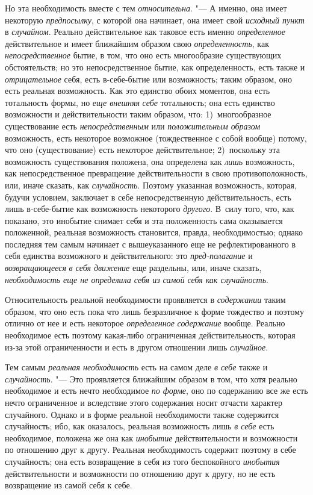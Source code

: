 Но эта необходимость вместе с тем {\em относительна}. "---
А именно, она имеет некоторую {\em предпосылку}, с
которой она начинает, она имеет свой {\em исходный
пункт} в {\em случайном}. Реально действительное как
таковое есть именно {\em определенное} действительное и
имеет ближайшим образом свою {\em определенность}, как
{\em непосредственное} бытие, в том, что оно есть
многообразие существующих обстоятельств; но это непосредственное бытие, как
определенность, есть также и {\em отрицательное} себя,
есть в-себе-бытие или возможность; таким образом, оно есть реальная
возможность. Как это единство обоих моментов, она есть тотальность формы,
но {\em еще внешняя} {\em себе}
тотальность; она есть единство возможности и действительности таким
образом, что: 1)~многообразное существование есть
{\em непосредственным} или
{\em положительным образом} возможность, есть некоторое
возможное (тождественное с собой вообще) потому, что оно (существование)
есть некоторое действительное; 2)~поскольку эта возможность существования
положена, она определена как {\em лишь} возможность,
как непосредственное превращение действительности в свою противоположность,
или, иначе сказать, как {\em случайность}. Поэтому
указанная возможность, которая, будучи условием, заключает в себе
непосредственную действительность, есть лишь в-себе-бытие как возможность
некоторого {\em другого}. В~силу того, что, как
показано, это инобытие снимает себя и эта положенность сама оказывается
положенной, реальная возможность становится, правда, необходимостью; однако
последняя тем самым начинает с вышеуказанного еще не рефлектированного в
себя единства возможного и действительного: это
{\em пред-полагание} и
{\em возвращающееся} {\em в себя
движение} еще раздельны, или, иначе сказать,
{\em необходимость еще не определила себя из самой себя
как случайность}.

Относительность реальной необходимости проявляется в
{\em содержании} таким образом, что оно есть пока что
лишь безразличное к форме тождество и поэтому отлично от нее и есть
некоторое {\em определенное}
{\em содержание} вообще. Реально необходимое есть
поэтому какая-либо ограниченная действительность, которая из-за этой
ограниченности и есть в другом отношении лишь
{\em случайное}.

Тем самым {\em реальная необходимость} есть на самом
деле {\em в себе} также и
{\em случайность}. "--- Это проявляется ближайшим образом
в том, что хотя реально необходимое и есть нечто необходимое
{\em по форме}, оно по содержанию все же есть нечто
ограниченное и вследствие этого содержания носит отчасти характер
случайного. Однако и в форме реальной необходимости также содержится
случайность; ибо, как оказалось, реальная возможность лишь
{\em в себе} есть необходимое, положена же она как
{\em инобытие} действительности и возможности по
отношению друг к другу. Реальная необходимость содержит поэтому в себе
случайность; она есть возвращение в себя из того беспокойного
{\em инобытия} действительности и возможности по
отношению друг к другу, но не есть возвращение из самой себя к себе.

